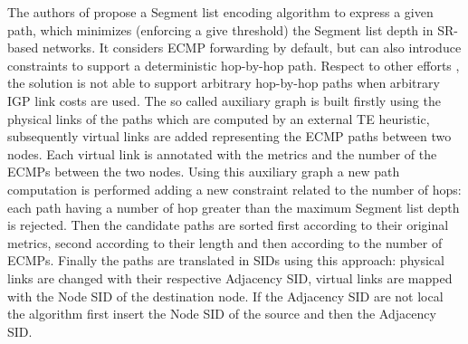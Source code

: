 The authors of \cite{efficientlabel} propose a Segment list encoding algorithm to express a given path, which minimizes (enforcing a give threshold) the Segment list depth in SR-based networks. It considers ECMP forwarding by default, but can also introduce constraints to support a deterministic hop-by-hop path. Respect to other efforts , the solution is not able to support arbitrary hop-by-hop paths when arbitrary IGP link costs are used. 
The so called auxiliary graph is built firstly using the physical links of the paths which are computed by an external TE heuristic, subsequently virtual links are added representing the ECMP paths between two nodes. Each virtual link is annotated with the metrics and the number of the ECMPs between the two nodes. Using this auxiliary graph a new path computation is performed adding a new constraint related to the number of hops: each path having a number of hop greater than the maximum Segment list depth is rejected. Then the candidate paths are sorted first according to their original metrics, second according to their length and then according to the number of ECMPs. Finally the paths are translated in SIDs using this approach: physical links are changed with their respective Adjacency SID, virtual links are mapped with the Node SID of the destination node. If the Adjacency SID are not local the algorithm first insert the Node SID of the source and then the Adjacency SID. 

